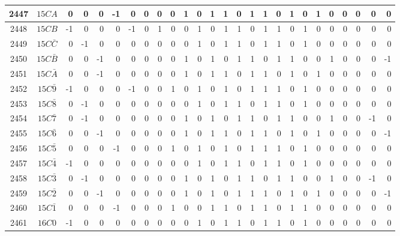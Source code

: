 \documentclass[12 pt]{article}%
\begin{document}
\begin{tiny}
\begin{centering}
\begin{longtable}{|c|c||rrrrrrrrrrrrrrrrrrrrrrrr|}
      \hline
      2447 & $15CA$ & 0 & 0 & 0 & -1 & 0 & 0 & 0 & 0 & 1 & 0 & 1 & 1 & 0 & 1 & 1 & 0 & 1 & 0 & 1 & 0 & 0 & 0 & 0 & 0 \\
      \hline
      2448 & $15CB$ & -1 & 0 & 0 & 0 & -1 & 0 & 1 & 0 & 0 & 1 & 0 & 1 & 1 & 0 & 1 & 1 & 0 & 1 & 0 & 0 & 0 & 0 & 0 & 0 \\
      \hline
      2449 & $15C\bar C$ & 0 & -1 & 0 & 0 & 0 & 0 & 0 & 0 & 0 & 1 & 0 & 1 & 1 & 0 & 1 & 1 & 0 & 1 & 0 & 0 & 0 & 0 & 0 & 0 \\
      \hline
      2450 & $15C\bar B$ & 0 & 0 & -1 & 0 & 0 & 0 & 0 & 0 & 1 & 0 & 1 & 0 & 1 & 1 & 0 & 1 & 1 & 0 & 0 & 1 & 0 & 0 & 0 & -1 \\
      \hline
      2451 & $15C\bar A$ & 0 & 0 & -1 & 0 & 0 & 0 & 0 & 0 & 1 & 0 & 1 & 1 & 0 & 1 & 1 & 0 & 1 & 0 & 1 & 0 & 0 & 0 & 0 & 0 \\
      \hline
      2452 & $15C\bar9$ & -1 & 0 & 0 & 0 & -1 & 0 & 0 & 1 & 0 & 1 & 0 & 1 & 0 & 1 & 1 & 1 & 0 & 1 & 0 & 0 & 0 & 0 & 0 & 0 \\
      \hline
      2453 & $15C\bar8$ & 0 & -1 & 0 & 0 & 0 & 0 & 0 & 0 & 0 & 1 & 0 & 1 & 1 & 0 & 1 & 1 & 0 & 1 & 0 & 0 & 0 & 0 & 0 & 0 \\
      \hline
      2454 & $15C\bar7$ & 0 & -1 & 0 & 0 & 0 & 0 & 0 & 0 & 1 & 0 & 1 & 0 & 1 & 1 & 0 & 1 & 1 & 0 & 0 & 1 & 0 & 0 & -1 & 0 \\
      \hline
      2455 & $15C\bar6$ & 0 & 0 & -1 & 0 & 0 & 0 & 0 & 0 & 1 & 0 & 1 & 1 & 0 & 1 & 1 & 0 & 1 & 0 & 1 & 0 & 0 & 0 & 0 & -1 \\
      \hline
      2456 & $15C\bar5$ & 0 & 0 & 0 & -1 & 0 & 0 & 0 & 1 & 0 & 1 & 0 & 1 & 0 & 1 & 1 & 1 & 0 & 1 & 0 & 0 & 0 & 0 & 0 & 0 \\
      \hline
      2457 & $15C\bar4$ & -1 & 0 & 0 & 0 & 0 & 0 & 0 & 0 & 0 & 1 & 0 & 1 & 1 & 0 & 1 & 1 & 0 & 1 & 0 & 0 & 0 & 0 & 0 & 0 \\
      \hline
      2458 & $15C\bar3$ & 0 & -1 & 0 & 0 & 0 & 0 & 0 & 0 & 1 & 0 & 1 & 0 & 1 & 1 & 0 & 1 & 1 & 0 & 0 & 1 & 0 & 0 & -1 & 0 \\
      \hline
      2459 & $15C\bar2$ & 0 & 0 & -1 & 0 & 0 & 0 & 0 & 0 & 1 & 0 & 1 & 0 & 1 & 1 & 1 & 0 & 1 & 0 & 1 & 0 & 0 & 0 & 0 & -1 \\
      \hline
      2460 & $15C\bar1$ & 0 & 0 & 0 & -1 & 0 & 0 & 0 & 1 & 0 & 0 & 1 & 1 & 0 & 1 & 1 & 0 & 1 & 1 & 0 & 0 & 0 & 0 & 0 & 0 \\
      \hline
      2461 & $16C0$ & -1 & 0 & 0 & 0 & 0 & 0 & 0 & 0 & 0 & 1 & 0 & 1 & 1 & 0 & 1 & 1 & 0 & 1 & 0 & 0 & 0 & 0 & 0 & 0 \\

\end{longtable}
\end{centering}
\end{tiny}
\end{document}
